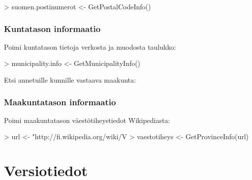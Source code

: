 \documentclass[a4paper,finnish]{article}
\begin{document}
\begin{Schunk}
\begin{Sinput}
> suomen.postinumerot <- GetPostalCodeInfo()
\end{Sinput}
\end{Schunk}



\subsubsection{Kuntatason informaatio}

Poimi kuntatason tietoja verkosta ja muodosta taulukko: 

\begin{Schunk}
\begin{Sinput}
> municipality.info <- GetMunicipalityInfo()
\end{Sinput}
\end{Schunk}

Etsi annetuille kunnille vastaava maakunta:

\begin{Schunk}
\end{Schunk}

\subsubsection{Maakuntatason informaatio}

Poimi maakuntatason väestötiheystiedot Wikipediasta:

\begin{Schunk}
\begin{Sinput}
> url <- "http://fi.wikipedia.org/wiki/V%C3%A4est%C3%B6tiheys"
> vaestotiheys <- GetProvinceInfo(url)
\end{Sinput}
\end{Schunk}

\section{Versiotiedot}
\end{document}
